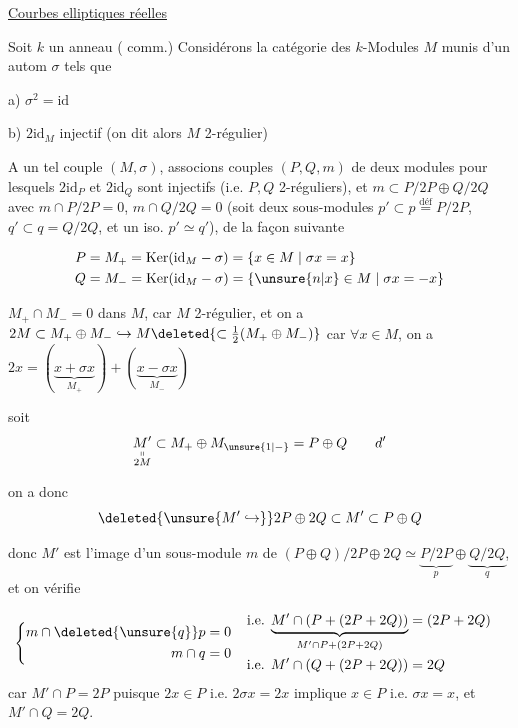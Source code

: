 \uline{Courbes elliptiques réelles}

Soit $k$ un anneau ( comm.)  Considérons la catégorie des $k$-Modules $M$ munis d'un autom $\sigma$  tels que

a) $\sigma^2=\mathrm{id}$

b) $2\mathrm{id}_M$ injectif (on dit alors $M$ 2-régulier)

A un tel couple $(M,\sigma)$,  associons  couples $(P,Q,m)$ de deux modules pour lesquels $2\mathrm{id}_P$ et $2\mathrm{id}_Q$ sont injectifs (i.e. $P,Q$ 2-réguliers), et $m\subset P/2P\oplus Q/2Q$  avec $m\cap P/2P=0$, $m\cap Q/2Q=0$ (soit deux sous-modules $p'\subset p\overset{\mathrm{déf}}=P/2P$, $q'\subset q=Q/2Q$, et un iso. $p'\simeq q'$), de la façon suivante

\[
\begin{aligned}
P&=M_+=\operatorname{Ker}(\mathrm{id}_M-\sigma)=\{x\in M\mid\sigma x=x\}\\
Q&=M_-=\operatorname{Ker}(\mathrm{id}_M-\sigma)=\{\unsure{n|x}\in M\mid\sigma x=-x\}
\end{aligned}
\]

 $M_+\cap M_-=0$ dans $M$, car $M$ 2-régulier, et on \margin{!} a $2M\subset M_+\oplus M_-\hookrightarrow M\deleted{\subset\tfrac12(M_+\oplus M_-)}$ car $\forall x\in M$, on a $2x=(\underset{M_+}{\underbrace{x+\sigma x}})+(\underset{M_-}{\underbrace{x-\sigma x}})$

soit
\[
\underset{\substack{\shortparallel\\2M}}{M'}\subset M_+\oplus M_{\unsure{1|-}}=P\oplus Q\qquad d'
\]

on a donc
\[
\deleted{\unsure{M'\hookrightarrow}}2P\oplus 2Q\subset M'\subset P\oplus Q
\]

donc $M'$ est l'image d'un sous-module $m$ de $(P\oplus Q)/2P\oplus 2Q\simeq\underset p{\underbrace{P/2P}}\oplus\underset q{\underbrace{Q/2Q}}$, et on vérifie 

\[
\begin{aligned}
\left\{\begin{aligned}m\cap\deleted{\unsure{q}}p&=0\\m\cap q&=0\end{aligned}\right.
&\quad\begin{aligned}
\text{i.e. } \underset{M'\cap P+(2P+2Q)}{\underbrace{M'\cap(P+(2P+2Q))}}&=(2P+2Q)\\
\text{i.e. }M'\cap(Q+(2P+2Q))&=2Q
\end{aligned}
\end{aligned}
\]
car $M'\cap P=2P$ puisque $2x\in P$ i.e. $2\sigma x=2x$ implique $x\in P$ i.e. $\sigma x=x$, et $M'\cap Q=2Q$.

